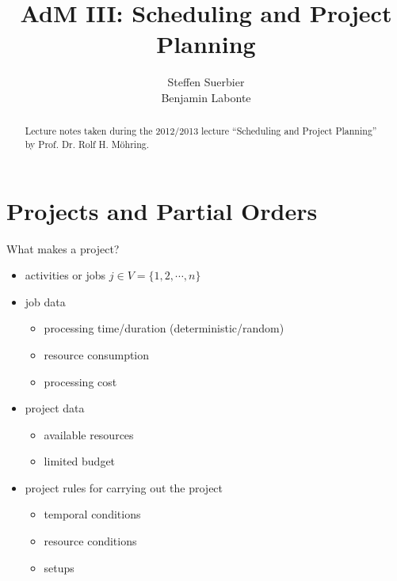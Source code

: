 \documentclass[11pt,a4paper,notitlepage]{article}
\author{Steffen Suerbier\\Benjamin Labonte}
\title{\sc AdM III: Scheduling and Project Planning}
\theoremstyle{plain}
\theoremstyle{definition}
\begin{document}

\maketitle

\begin{abstract}
Lecture notes taken during the 2012/2013 lecture ``Scheduling and Project
Planning'' by Prof. Dr. Rolf H. Möhring.
\end{abstract}

\tableofcontents

\pagebreak


%



\section{Projects and Partial Orders}
\label{sec:projects_and_partial_orders}

What makes a project?
\begin{itemize}
  \item activities or jobs $j\in V = \{1,2,\cdots,n\}$
  \item job data
  \begin{itemize}
    \item processing time/duration (deterministic/random)
    \item resource consumption
    \item processing cost
  \end{itemize}
  \item project data
  \begin{itemize}
    \item available resources
    \item limited budget
  \end{itemize}
  \item project rules for carrying out the project
  \begin{itemize}
    \item temporal conditions
    \item resource conditions
    \item setups
  \end{itemize}
\end{itemize}
\end{document}
